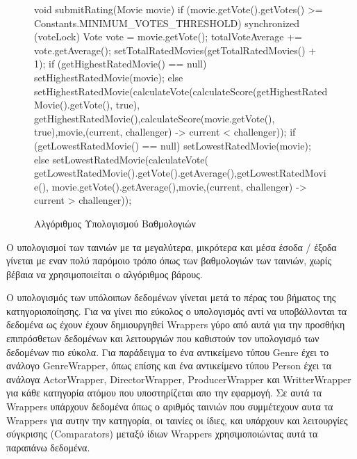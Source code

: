 \begin{figure}[h]
    \begin{javacode}
void submitRating(Movie movie) {
    if (movie.getVote().getVotes() >= Constants.MINIMUM_VOTES_THRESHOLD) {
        synchronized (voteLock) {
            Vote vote = movie.getVote();
            totalVoteAverage += vote.getAverage();
            setTotalRatedMovies(getTotalRatedMovies() + 1);
            if (getHighestRatedMovie() == null) {
                setHighestRatedMovie(movie);
            } else {
                setHighestRatedMovie(calculateVote(calculateScore(getHighestRatedMovie().getVote(), true), getHighestRatedMovie(),calculateScore(movie.getVote(), true),movie,(current, challenger) -> current < challenger));
            }
            if (getLowestRatedMovie() == null) {
                setLowestRatedMovie(movie);
            } else {
                setLowestRatedMovie(calculateVote( getLowestRatedMovie().getVote().getAverage(),getLowestRatedMovie(), movie.getVote().getAverage(),movie,(current, challenger) -> current > challenger));
            }
        }
    }
}   
    \end{javacode}
    \caption{Αλγόριθμος Υπολογισμού Βαθμολογιών}
   \label{code:ratingCalculation}
\end{figure}

Ο υπολογισμοί των ταινιών με τα μεγαλύτερα, μικρότερα και μέσα έσοδα / έξοδα γίνεται με εναν πολύ παρόμοιο τρόπο όπως των βαθμολογιών των ταινιών, χωρίς βέβαια να χρησιμοποιείται ο αλγόριθμος βάρους.

Ο υπολογισμός των υπόλοιπων δεδομένων γίνεται μετά το πέρας του βήματος της κατηγοριοποίησης. Για να γίνει πιο εύκολος ο υπολογισμός αντί να υποβάλλονται τα δεδομένα ως έχουν έχουν δημιουργηθεί Wrappers γύρο από αυτά για την προσθήκη επιπρόσθετων δεδομένων και λειτουργιών που καθιστούν τον υπολογισμό των δεδομένων πιο εύκολα. Για παράδειγμα το ένα αντικείμενο τύπου Genre έχει το ανάλογο GenreWrapper, όπως επίσης και ένα αντικείμενο τύπου Person έχει τα ανάλογα ActorWrapper, DirectorWrapper, ProducerWrapper και WritterWrapper για κάθε κατηγορία ατόμου που υποστηρίζεται απο την εφαρμογή. Σε αυτά τα Wrappers υπάρχουν δεδομένα όπως ο αριθμός ταινιών που συμμέτεχουν αυτα τα Wrappers για αυτην την κατηγορία, οι ταινίες οι ίδιες, και υπάρχουν και λειτουργίες σύγκρισης (Comparators) μεταξύ ίδιων Wrappers χρησιμοποιώντας αυτά τα παραπάνω δεδομένα.

